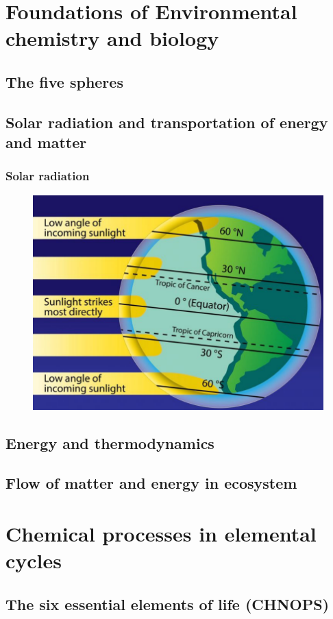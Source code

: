\documentclass{article}
\newcommand{\cfig}[1]{%
  \begin{figure}[ht!]%
    \centering%
    #1%
  \end{figure}%
}
\begin{document}
\newpage
\section{Foundations of Environmental chemistry and biology}
\subsection{The five spheres}



\subsection{Solar radiation and transportation of energy and matter}
\subsubsection{Solar radiation}

\cfig{\includegraphics*[width=.5\textwidth]{media/solar-radiation.png}}


\subsection{Energy and thermodynamics}



\subsection{Flow of matter and energy in ecosystem}



\section{Chemical processes in elemental cycles}
\subsection{The six essential elements of life (CHNOPS)}
\end{document}

